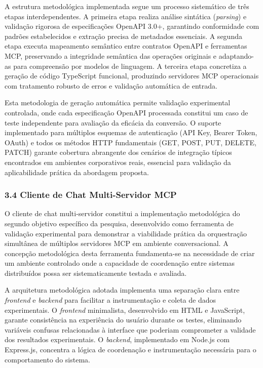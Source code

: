 \documentclass[
]{article}
\begin{document}
A estrutura metodológica implementada segue um processo sistemático de
três etapas interdependentes. A primeira etapa realiza análise sintática
(\emph{parsing}) e validação rigorosa de especificações OpenAPI 3.0+,
garantindo conformidade com padrões estabelecidos e extração precisa de
metadados essenciais. A segunda etapa executa mapeamento semântico entre
contratos OpenAPI e ferramentas MCP, preservando a integridade semântica
das operações originais e adaptando-as para compreensão por modelos de
linguagem. A terceira etapa concretiza a geração de código TypeScript
funcional, produzindo servidores MCP operacionais com tratamento robusto
de erros e validação automática de entrada.

Esta metodologia de geração automática permite validação experimental
controlada, onde cada especificação OpenAPI processada constitui um caso
de teste independente para avaliação da eficácia da conversão. O suporte
implementado para múltiplos esquemas de autenticação (API Key, Bearer
Token, OAuth) e todos os métodos HTTP fundamentais (GET, POST, PUT,
DELETE, PATCH) garante cobertura abrangente dos cenários de integração
típicos encontrados em ambientes corporativos reais, essencial para
validação da aplicabilidade prática da abordagem proposta.

\subsubsection{3.4 Cliente de Chat Multi-Servidor
MCP}\label{cliente-de-chat-multi-servidor-mcp}

O cliente de chat multi-servidor constitui a implementação metodológica
do segundo objetivo específico da pesquisa, desenvolvido como ferramenta
de validação experimental para demonstrar a viabilidade prática da
orquestração simultânea de múltiplos servidores MCP em ambiente
conversacional. A concepção metodológica desta ferramenta fundamenta-se
na necessidade de criar um ambiente controlado onde a capacidade de
coordenação entre sistemas distribuídos possa ser sistematicamente
testada e avaliada.

A arquitetura metodológica adotada implementa uma separação clara entre
\emph{frontend} e \emph{backend} para facilitar a instrumentação e
coleta de dados experimentais. O \emph{frontend} minimalista,
desenvolvido em HTML e JavaScript, garante consistência na experiência
do usuário durante os testes, eliminando variáveis confusas relacionadas
à interface que poderiam comprometer a validade dos resultados
experimentais. O \emph{backend}, implementado em Node.js com Express.js,
concentra a lógica de coordenação e instrumentação necessária para o
comportamento do sistema.
\end{document}
